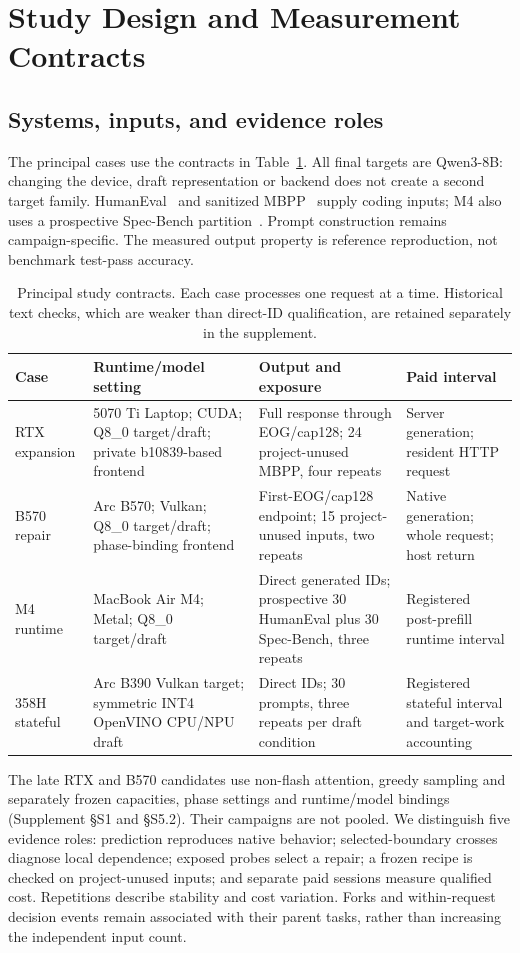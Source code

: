 \section{Study Design and Measurement Contracts}
\label{sec:methods}
\subsection{Systems, inputs, and evidence roles}
The principal cases use the contracts in Table~\ref{tab:contracts}. All final targets are Qwen3-8B: changing the device, draft representation or backend does not create a second target family. HumanEval~\cite{humaneval} and sanitized MBPP~\cite{mbpp} supply coding inputs; M4 also uses a prospective Spec-Bench partition~\cite{specbench}. Prompt construction remains campaign-specific. The measured output property is reference reproduction, not benchmark test-pass accuracy.

\begin{table}[t]\centering\small
\caption{Principal study contracts. Each case processes one request at a time. Historical text checks, which are weaker than direct-ID qualification, are retained separately in the supplement.}
\label{tab:contracts}
\begin{tabularx}{\linewidth}{@{}p{.17\linewidth}p{.26\linewidth}XX@{}}\toprule
Case & Runtime/model setting & Output and exposure & Paid interval\\\midrule
RTX expansion & 5070 Ti Laptop; CUDA; Q8\_0 target/draft; private b10839-based frontend & Full response through EOG/cap128; 24 project-unused MBPP, four repeats & Server generation; resident HTTP request\\
B570 repair & Arc B570; Vulkan; Q8\_0 target/draft; phase-binding frontend & First-EOG/cap128 endpoint; 15 project-unused inputs, two repeats & Native generation; whole request; host return\\
M4 runtime & MacBook Air M4; Metal; Q8\_0 target/draft & Direct generated IDs; prospective 30 HumanEval plus 30 Spec-Bench, three repeats & Registered post-prefill runtime interval\\
358H stateful & Arc B390 Vulkan target; symmetric INT4 OpenVINO CPU/NPU draft & Direct IDs; 30 prompts, three repeats per draft condition & Registered stateful interval and target-work accounting\\\bottomrule
\end{tabularx}
\end{table}

The late RTX and B570 candidates use non-flash attention, greedy sampling and separately frozen capacities, phase settings and runtime/model bindings (Supplement \S S1 and \S S5.2). Their campaigns are not pooled. We distinguish five evidence roles: prediction reproduces native behavior; selected-boundary crosses diagnose local dependence; exposed probes select a repair; a frozen recipe is checked on project-unused inputs; and separate paid sessions measure qualified cost. Repetitions describe stability and cost variation. Forks and within-request decision events remain associated with their parent tasks, rather than increasing the independent input count.

